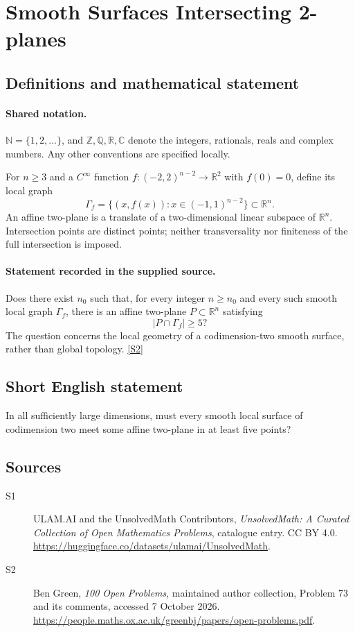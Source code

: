 \documentclass[11pt]{article}
\newcommand{\sref}[2]{\hyperlink{source:#1:#2}{[S#2]}}
\begin{document}
\section{Smooth Surfaces Intersecting 2-planes}\label{statement}

\subsection{Definitions and mathematical statement}

\paragraph{Shared notation.}$\mathbb N=\{1,2,\ldots\}$, and $\mathbb Z,\mathbb Q,\mathbb R,\mathbb C$ denote the integers, rationals, reals and complex numbers. Any other conventions are specified locally.


For $n\geq3$ and a $C^\infty$ function $f:(-2,2)^{n-2}\to\mathbb R^2$ with $f(0)=0$, define its local graph
\[
 \Gamma_f=\{(x,f(x)):x\in(-1,1)^{n-2}\}\subset\mathbb R^n.
\]
An affine two-plane is a translate of a two-dimensional linear subspace of $\mathbb R^n$. Intersection points are distinct points; neither transversality nor finiteness of the full intersection is imposed.
\paragraph{Statement recorded in the supplied source.}
Does there exist $n_0$ such that, for every integer $n\geq n_0$ and every such smooth local graph $\Gamma_f$, there is an affine two-plane $P\subset\mathbb R^n$ satisfying
\[
 |P\cap\Gamma_f|\geq5?
\]
The question concerns the local geometry of a codimension-two smooth surface, rather than global topology. \sref{statement}{2}
\subsection{Short English statement}
In all sufficiently large dimensions, must every smooth local surface of codimension two meet some affine two-plane in at least five points?
\subsection{Sources}
\begin{description}
\item[\hypertarget{source:statement:1}{S1}] ULAM.AI and the UnsolvedMath Contributors, \emph{UnsolvedMath: A Curated Collection of Open Mathematics Problems}, catalogue entry. CC BY 4.0. \url{https://huggingface.co/datasets/ulamai/UnsolvedMath}.
\item[\hypertarget{source:statement:2}{S2}] Ben Green, \emph{100 Open Problems}, maintained author collection, Problem 73 and its comments, accessed 7 October 2026. \url{https://people.maths.ox.ac.uk/greenbj/papers/open-problems.pdf}.
\end{description}
\label{end:statement}
\end{document}
